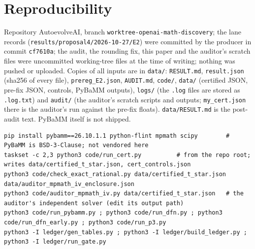 \documentclass[10pt]{article}
\begin{document}
\section{Reproducibility}\label{sec:repro}
Repository AutoevolveAI, branch \texttt{worktree-openai-math-discovery}; the lane records (\texttt{results/proposal4/2026-10-27/E2}) were committed by the producer in commit \texttt{cf7610a}; the audit, the rounding fix, this paper and the auditor's scratch files were uncommitted working-tree files at the time of writing; nothing was pushed or uploaded. Copies of all inputs are in \texttt{data/}: \texttt{RESULT.md}, \texttt{result.json} (sha256 of every file), \texttt{prereg\_E2.json}, \texttt{AUDIT.md}, \texttt{code/}, \texttt{data/} (certified JSON, pre-fix JSON, controls, PyBaMM outputs), \texttt{logs/} (the \texttt{.log} files are stored as \texttt{.log.txt}) and \texttt{audit/} (the auditor's scratch scripts and outputs; \texttt{my\_cert.json} there is the auditor's run against the pre-fix floats). \texttt{data/RESULT.md} is the post-audit text. PyBaMM itself is not shipped.
\begin{lstlisting}[basicstyle=\ttfamily\scriptsize]
pip install pybamm==26.10.1.1 python-flint mpmath scipy        # PyBaMM is BSD-3-Clause; not vendored here
taskset -c 2,3 python3 code/run_cert.py          # from the repo root; writes data/certified_t_star.json, cert_controls.json
python3 code/check_exact_rational.py data/certified_t_star.json data/auditor_mpmath_iv_enclosure.json
python3 code/auditor_mpmath_iv.py data/certified_t_star.json   # the auditor's independent solver (edit its output path)
python3 code/run_pybamm.py ; python3 code/run_dfn.py ; python3 code/run_dfn_early.py ; python3 code/run_p3.py
python3 -I ledger/gen_tables.py ; python3 -I ledger/build_ledger.py ; python3 -I ledger/run_gate.py
\end{lstlisting}
\end{document}
